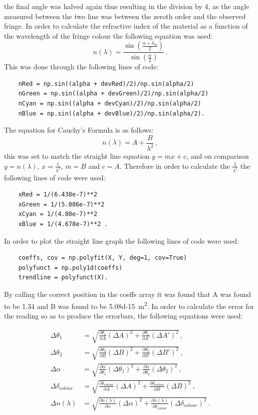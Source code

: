 \documentclass[12pt, a4paper]{article}
\begin{document}
the final angle was halved again thus resulting in the division by 4, as the angle measured between the two line was between the zeroth order and the observed fringe. In order to calculate the refractive index of the material as a function of the wavelength of the fringe colour the following equation was used:
\begin{equation*}
    n(\lambda) = \frac{\sin{\left(\frac{\alpha + \delta_m}{2}\right)}}{\sin{\left(\frac{\alpha}{2}\right)}}\,.
\end{equation*}
This was done through the following lines of code:
\begin{verbatim}
    nRed = np.sin((alpha + devRed)/2)/np.sin(alpha/2)
    nGreen = np.sin((alpha + devGreen)/2)/np.sin(alpha/2)
    nCyan = np.sin((alpha + devCyan)/2)/np.sin(alpha/2)
    nBlue = np.sin((alpha + devBlue)/2)/np.sin(alpha/2).
\end{verbatim}
The equation for Cauchy's Formula is as follows:
\begin{equation*}
    n(\lambda)=A+\frac{B}{\lambda^2}\,,
\end{equation*}
this was set to match the straight line equation $y = mx + c$, and on comparison $y = n(\lambda)$, $x = \frac{1}{\lambda^2}$, $m = B$ and $c = A$. Therefore in order to calculate the $\frac{1}{\lambda^2}$ the following lines of code were used:
\begin{verbatim}
    xRed = 1/(6.438e-7)**2
    xGreen = 1/(5.086e-7)**2
    xCyan = 1/(4.80e-7)**2
    xBlue = 1/(4.678e-7)**2 .
\end{verbatim}
In order to plot the straight line graph the following lines of code were used:
\begin{verbatim}
    coeffs, cov = np.polyfit(X, Y, deg=1, cov=True)
    polyfunct = np.poly1d(coeffs)
    trendline = polyfunct(X).
\end{verbatim}
By calling the correct position in the coeffs array it was found that A was found to be 1.34 and B was found to be \qty{5.08d-15}{\metre\squared}. In order to calculate the error for the reading so as to produce the errorbars, the following equations were used:

\begin{align*}
    \Delta \theta_1 &= \sqrt{\frac{\partial \theta_1}{\partial A}(\Delta A)^2+\frac{\partial \theta_1}{\partial A'}(\Delta A')^2}\,,\\
    \Delta \theta_2 &= \sqrt{\frac{\partial \theta_2}{\partial B}(\Delta B)^2+\frac{\partial \theta_2}{\partial B'}(\Delta B')^2}\,,\\
    \Delta \alpha &= \sqrt{\frac{\partial \alpha}{\partial \theta_1}(\Delta \theta_1)^2+\frac{\partial \alpha}{\partial \theta_2}(\Delta \theta_2)^2}\,,\\
    \Delta \delta_{colour} &= \sqrt{\frac{\partial \delta_{colour}}{\partial A}(\Delta A)^2+\frac{\partial \delta_{colour}}{\partial B}(\Delta B)^2}\,,\\
    \Delta n(\lambda) &= \sqrt{\frac{\partial n(\lambda)}{\partial \alpha}(\Delta \alpha)^2+\frac{\partial n(\lambda)}{\partial \delta_{colour}}(\Delta \delta_{colour})^2}\,.
\end{align*}
\end{document}
